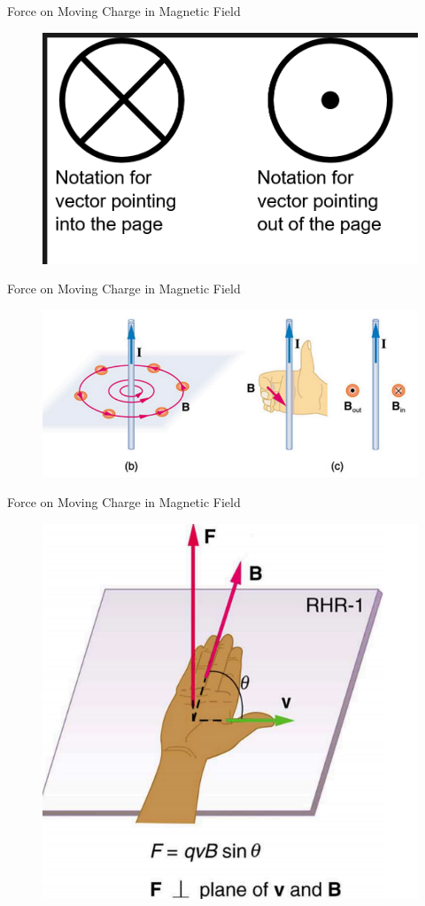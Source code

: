 \documentclass{beamer}
\begin{document}
\begin{frame}{Force on Moving Charge in Magnetic Field}
\begin{figure}
    \centering
    \includegraphics[width=0.75\linewidth]{vectarr.png}
\end{figure}

\end{frame}

\begin{frame}{Force on Moving Charge in Magnetic Field}
\begin{figure}
\centering
\includegraphics[width=0.75\linewidth]{mgRHR.png}
\end{figure}
\end{frame}



\begin{frame}{Force on Moving Charge in Magnetic Field}
\begin{figure}
\centering
\includegraphics[width=0.8\linewidth]{rhr1-.png}
\end{figure}
\end{frame}
\end{document}
